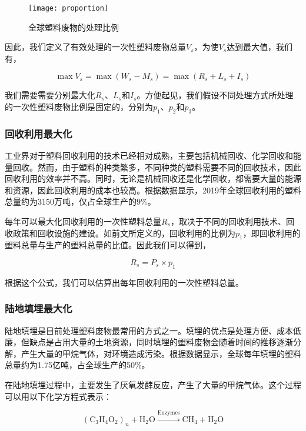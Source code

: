 \documentclass[UTF8, fontset=windows]{mcmthesis}
\begin{document}
\begin{figure}
\centering
\texttt{[image: proportion]}
\caption{全球塑料废物的处理比例}
\label{fig:proportion}
\end{figure}

因此，我们定义了有效处理的一次性塑料废物总量$V_s$，为使$V_s$达到最大值，我们有，

\begin{equation}
\max V_s = \max (W_s - M_s) = \max (R_s + L_s + I_s)
\end{equation}

我们需要需要分别最大化$R_s$、$L_s$和$I_s$。方便起见，我们假设不同处理方式所处理的一次性塑料废物比例是固定的，分别为$p_1$、$p_2$和$p_3$。

\subsubsection{回收利用最大化}

工业界对于塑料回收利用的技术已经相对成熟，主要包括机械回收、化学回收和能量回收\cite{hopewell2009plastics}。然而，由于塑料的种类繁多，不同种类的塑料需要不同的回收技术，因此回收利用的效率并不高。同时，无论是机械回收还是化学回收，都需要大量的能源和资源，因此回收利用的成本也较高。根据数据显示\cite{annexcompose}，2019年全球回收利用的塑料总量约为3150万吨，仅占全球生产的9\%。

每年可以最大化回收利用的一次性塑料总量$R_s$，取决于不同的回收利用技术、回收政策和回收设施的建设。如前文所定义的，回收利用的比例为$p_1$，即回收利用的塑料总量与生产的塑料总量的比值。因此我们可以得到，

\begin{equation}
R_s = P_s \times p_1
\end{equation}

根据这个公式，我们可以估算出每年回收利用的一次性塑料总量。

\subsubsection{陆地填埋最大化}

陆地填埋是目前处理塑料废物最常用的方式之一。填埋的优点是处理方便、成本低廉，但缺点是占用大量的土地资源，同时填埋的塑料废物会随着时间的推移逐渐分解，产生大量的甲烷气体，对环境造成污染。根据数据显示\cite{annexcompose}，全球每年填埋的塑料总量约为1.75亿吨，占全球生产的50\%。

在陆地填埋过程中，主要发生了厌氧发酵反应，产生了大量的甲烷气体。这个过程可以用以下化学方程式表示：

\begin{equation}
(\text{C}_3\text{H}_4\text{O}_2)_n + \text{H}_2\text{O} \xrightarrow{\text{Enzymes}} \text{CH}_4 + \text{H}_2\text{O}
\end{equation}
\end{document}
